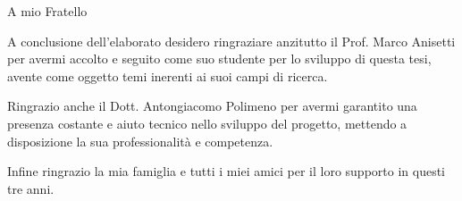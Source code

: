 \documentclass[12pt,italian]{report}
\newcommand\blankpage{%
    \null
    \thispagestyle{empty}%
    \addtocounter{page}{-1}%
    \newpage}
\begin{document}
\frontespizio
\beforepreface


{\raggedleft \large \sl 
	\vspace{6cm}

	
	A mio Fratello
	\bigskip
	
	}


\afterpreface

\afterpage{\blankpage}


\afterpage{\blankpage}


\afterpage{\blankpage}


\afterpage{\blankpage}


\afterpage{\blankpage}


\afterpage{\blankpage}





\afterpage{\blankpage}

A conclusione dell'elaborato desidero ringraziare anzitutto il Prof. Marco Anisetti per avermi accolto e seguito come suo studente per lo sviluppo di questa tesi, avente come oggetto temi inerenti ai suoi campi di ricerca.

Ringrazio anche il Dott. Antongiacomo Polimeno per avermi garantito una presenza costante e aiuto tecnico nello sviluppo del progetto, mettendo a disposizione la sua professionalit\`a e competenza.

Infine ringrazio la mia famiglia e tutti i miei amici per il loro supporto in questi tre anni.
\closingpage
\end{document}
